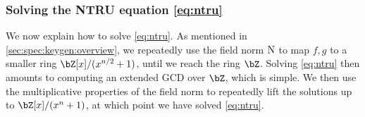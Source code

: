  \subsubsection{Solving the NTRU equation \eqref{eq:ntru}}
 
 We now explain how to solve \eqref{eq:ntru}. As mentioned in \cref{sec:spec:keygen:overview}, we repeatedly use the field norm $\operatorname{N}$ to map $f,g$ to a smaller ring $\bZ[x]/(x^{n/2}+1)$, until we reach the ring $\bZ$. Solving \eqref{eq:ntru} then amounts to computing an extended GCD over $\bZ$, which is simple. We then use the multiplicative properties of the field norm to repeatedly lift the solutions up to $\bZ[x]/(x^{n}+1)$, at which point we have solved \eqref{eq:ntru}.
 
 

  \begin{algorithm}[!htp]
  \caption{$\ntrusolve_{n,q}(f, g)$\hfill}\label{alg:ntrusolve}
 \begin{algorithmic}[1]

  \label{line:botgcd}
  \label{line:botgcd2}
  \EndIf
  \Else

  \label{line:g} 
  \label{line:f}
  \EndIf
  \end{algorithmic}
 \end{algorithm}
 
